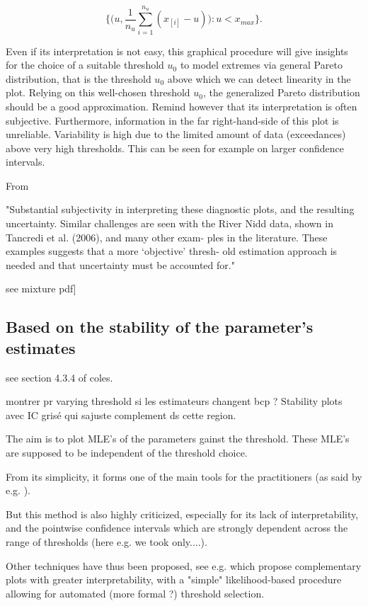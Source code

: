 \documentclass[11pt,a4paper,openany ]{book}
\begin{document}
\begin{equation}
\Bigg\{\bigg(u,\frac{1}{n_u}\sum_{i=1}^{n_u}(x_{[i]}-u)\bigg):u<x_{max}\Bigg\}.
\end{equation}

Even if its interpretation is not easy, this graphical procedure will give insights for the choice of a suitable threshold $u_0$ to model extremes via general Pareto distribution, that is the threshold $u_0$ above which we can detect linearity in the plot. Relying on this well-chosen threshold $u_0$, the generalized Pareto distribution should be a good approximation.
Remind however that its interpretation is often subjective. Furthermore, information in the far right-hand-side of this plot is unreliable. Variability is high due to the limited amount of data (exceedances) above very high thresholds. This can be seen for example on larger confidence intervals.

From \cite[pp.83-84]{coles_introduction_2001} 


"Substantial subjectivity in interpreting these
diagnostic plots, and the resulting uncertainty. Similar challenges are seen with
the River Nidd data, shown in Tancredi et al. (2006), and many other exam-
ples in the literature. These examples suggests that a more ‘objective’ thresh-
old estimation approach is needed and that uncertainty must be accounted for."

see mixture pdf]



\subsection*{Based on the stability of the parameter's estimates}
see section 4.3.4 of coles.

montrer pr varying threshold si les estimateurs changent bcp ?  Stability plots avec IC grisé qui sajuste complement ds cette region.

The aim is to plot MLE's of the parameters gainst the threshold. These MLE's are supposed to be independent of the threshold choice. 

From its simplicity, it forms one of the main tools for the practitioners (as said by e.g. \citet{} ).

But this method is also highly criticized, especially for its lack of interpretability, and the pointwise confidence intervals which are strongly dependent across the range of thresholds (here e.g. we took only....).

Other techniques have thus been proposed, see e.g. \citet{Wadsworth_exploiting_2016} which propose complementary plots with greater interpretability, with a "simple" likelihood-based procedure allowing for automated (more formal ?) threshold selection.
\end{document}
